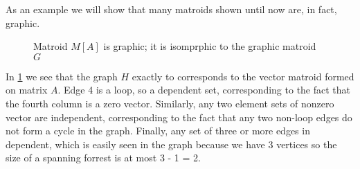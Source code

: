 As an example we will show that many matroids shown until now are, in fact, graphic. 


 
\begin{figure}[H]
    \centering
    \qquad
    \caption{Matroid $M[A]$ is graphic; it is isomprphic to the graphic matroid $G$}%
    \label{graphic}%
\end{figure}

In \ref{graphic} we see that the graph $H$ exactly to corresponds to the vector matroid formed on matrix $A$. Edge 4 is a loop, so a dependent set, corresponding to the fact that the fourth column is a zero vector. Similarly, any two element sets of nonzero vector are independent, corresponding to the fact that any two non-loop edges do not form a cycle in the graph. Finally, any set of three or more edges in dependent, which is easily seen in the graph because we have 3 vertices so the size of a spanning forrest is at most 3 - 1 = 2.


